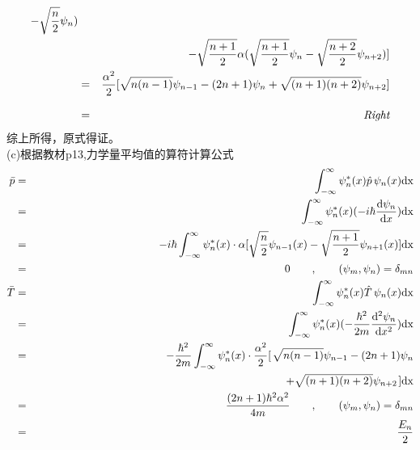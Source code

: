 \documentclass[a4paper]{article}
\begin{document}
\begin{CJK*}{UTF8}{song}
{\begin{eqnarray}
                        - \sqrt{\frac{n}{2}}\psi_{n})\nonumber\\
                    &   & - \sqrt{\frac{n + 1}{2}}{\alpha}(\sqrt{\frac{n+1}{2}}\psi_{n}
                        - \sqrt{\frac{n + 2}{2}}\psi_{n+2})]\nonumber\\
                    & = & \frac{\alpha^{2}}{2}[\sqrt{n(n-1)}\psi_{n-1} - (2n+1)\psi_{n}
                        + \sqrt{(n+1)(n+2)}\psi_{n+2}]\nonumber\\[8pt]
                    & = & \emph{Right}\nonumber
    \end{eqnarray}
    综上所得，原式得证。\\[12pt]
    (c)根据教材p13,力学量平均值的算符计算公式
    \begin{eqnarray}
        \bar{p} & = & \int_{-\infty}^{\infty}
                        \psi_{n}^{*}(x)\hat{p}\,\psi_{n}(x)\mathrm{d x}\nonumber\\
            & = & \int_{-\infty}^{\infty}\psi_{n}^{*}(x)
                        (- i\hbar\frac{\mathrm{d}\psi_{n}}{\mathrm{d} x})\mathrm{d x}\nonumber\\
            & = & - i\hbar\int_{-\infty}^{\infty}\psi_{n}^{*}(x)
                        \cdot{\alpha}[\sqrt{\frac{n}{2}}\psi_{n-1}(x)
                        - \sqrt{\frac{n + 1}{2}}\psi_{n+1}(x)]\mathrm{d x}\nonumber\\
            & = & 0 \qquad,\qquad (\psi_{m},\psi_{n})=\delta_{m n}\nonumber\\
        \bar{T}   & = & \int_{-\infty}^{\infty}
                        \psi_{n}^{*}(x)\hat{T}\,\psi_{n}(x)\mathrm{d x}\nonumber\\
            & = & \int_{-\infty}^{\infty}\psi_{n}^{*}(x)
                        (- \frac{\hbar^{2}}{2 m}\frac{\mathrm{d^{2}}\psi_{n}}{\mathrm{d} x^{2}})\mathrm{d x}\nonumber\\
            & = & - \frac{\hbar^{2}}{2 m}\int_{-\infty}^{\infty}\psi_{n}^{*}(x)
                \cdot\frac{\alpha^{2}}{2}\mbox{$\left[\right.$}\sqrt{n(n-1)}\psi_{n-1} - (2n+1)\psi_{n}\nonumber\\
            &   & \rightline{\mbox{$+ \sqrt{(n+1)(n+2)}\psi_{n+2}{\left.\right]}\mathrm{d x}$}}\nonumber\\
            & = & \frac{(2 n + 1 )\hbar^{2}\alpha^{2}}{4m}
                \qquad,\qquad (\psi_{m},\psi_{n})=\delta_{m n}\nonumber\\
            & = & \frac{E_{n}}{2}\nonumber
    \end{eqnarray}
    }\\[20pt]

\end{CJK*}
\end{document}
